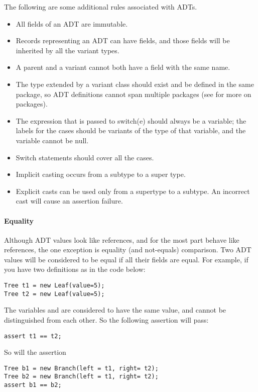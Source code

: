 The following are some additional rules associated with ADTs. 
\begin{itemize}
\item All fields of an ADT are immutable. 
\item Records representing an ADT can have fields, and those fields will be inherited by all the variant types.
\item A parent and a variant cannot both have a field with the same name. 
\item The type extended by a variant class should exist and be defined in the same package, so ADT definitions cannot span multiple packages (see  for more on packages).
\item The expression that is passed to switch(e) should always be a variable; the labels for the cases should be variants of the type of that variable, and the variable cannot be null.
\item Switch statements should cover all the cases.
\item Implicit casting occurs from a subtype to a super type.
\item Explicit casts can be used only from a supertype to a subtype. An incorrect cast will cause an assertion failure. 
\end{itemize}


\paragraph{Equality}

Although ADT values look like references, and for the most part behave like references, the one exception is equality (and not-equals) comparison. Two ADT values will be considered to be equal if all their fields are equal. For example, if you have two definitions as in the code below:

\begin{lstlisting}
Tree t1 = new Leaf(value=5);
Tree t2 = new Leaf(value=5);
\end{lstlisting}

The variables  and  are considered to have the same value, and cannot be distinguished from each other. So the following assertion will pass:
\begin{lstlisting}
assert t1 == t2;
\end{lstlisting}
So will the assertion

\begin{lstlisting}
Tree b1 = new Branch(left = t1, right= t2);
Tree b2 = new Branch(left = t1, right= t2);
assert b1 == b2;
\end{lstlisting}

